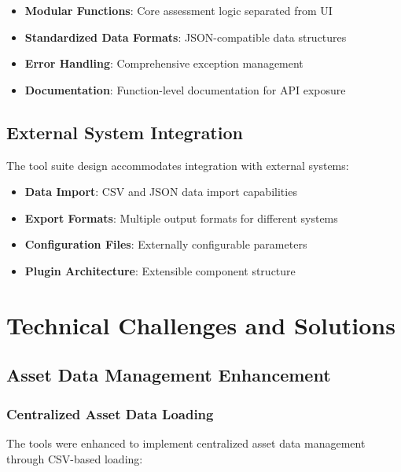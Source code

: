 \documentclass[binding=0.6cm]{sapthesis}
\begin{document}
\begin{itemize}
    \item \textbf{Modular Functions}: Core assessment logic separated from UI
    \item \textbf{Standardized Data Formats}: JSON-compatible data structures
    \item \textbf{Error Handling}: Comprehensive exception management
    \item \textbf{Documentation}: Function-level documentation for API exposure
\end{itemize}

\subsection{External System Integration}

The tool suite design accommodates integration with external systems:

\begin{itemize}
    \item \textbf{Data Import}: CSV and JSON data import capabilities
    \item \textbf{Export Formats}: Multiple output formats for different systems
    \item \textbf{Configuration Files}: Externally configurable parameters
    \item \textbf{Plugin Architecture}: Extensible component structure
\end{itemize}

\section{Technical Challenges and Solutions}

\subsection{Asset Data Management Enhancement}

\subsubsection{Centralized Asset Data Loading}

The tools were enhanced to implement centralized asset data management through CSV-based loading:
\end{document}
